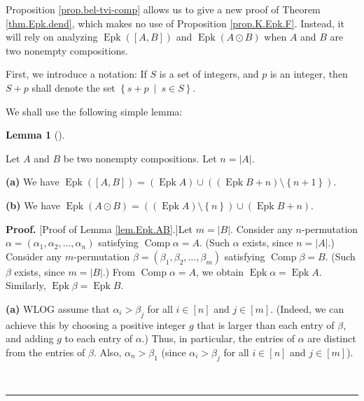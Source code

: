 \documentclass[numbers=enddot,12pt,final,onecolumn,notitlepage]{scrartcl}%
\theoremstyle{definition}
\newtheorem{lem}[theo]{Lemma}
\newenvironment{lemma}[1][]
{\begin{lem}[#1]\begin{leftbar}}
{\end{leftbar}\end{lem}}
\newenvironment{proof}[1][Proof]{\noindent\textbf{#1.} }{\ \rule{0.5em}{0.5em}}
\newenvironment{verlong}{}{}
\begin{document}
\begin{verlong}
Proposition \ref{prop.bel-tvi-comp} allows us to give a new proof of Theorem
\ref{thm.Epk.dend}, which makes no use of Proposition \ref{prop.K.Epk.F}.
Instead, it will rely on analyzing $\operatorname*{Epk}\left(  \left[
A,B\right]  \right)  $ and $\operatorname*{Epk}\left(  A\odot B\right)  $ when
$A$ and $B$ are two nonempty compositions.

First, we introduce a notation: If $S$ is a set of integers, and $p$ is an
integer, then $S+p$ shall denote the set $\left\{  s+p\ \mid\ s\in S\right\}
$.

We shall use the following simple lemma:

\begin{lemma}
\label{lem.Epk.AB}Let $A$ and $B$ be two nonempty compositions. Let
$n=\left\vert A\right\vert $.

\textbf{(a)} We have $\operatorname*{Epk}\left(  \left[  A,B\right]  \right)
=\left(  \operatorname*{Epk}A\right)  \cup\left(  \left(  \operatorname*{Epk}%
B+n\right)  \setminus\left\{  n+1\right\}  \right)  $.

\textbf{(b)} We have $\operatorname*{Epk}\left(  A\odot B\right)  =\left(
\left(  \operatorname*{Epk}A\right)  \setminus\left\{  n\right\}  \right)
\cup\left(  \operatorname*{Epk}B+n\right)  $.
\end{lemma}

\begin{proof}
[Proof of Lemma \ref{lem.Epk.AB}.]Let $m=\left\vert B\right\vert $. Consider
any $n$-permutation $\alpha=\left(  \alpha_{1},\alpha_{2},\ldots,\alpha
_{n}\right)  $ satisfying $\operatorname*{Comp}\alpha=A$. (Such $\alpha$
exists, since $n=\left\vert A\right\vert $.) Consider any $m$-permutation
$\beta=\left(  \beta_{1},\beta_{2},\ldots,\beta_{m}\right)  $ satisfying
$\operatorname*{Comp}\beta=B$. (Such $\beta$ exists, since $m=\left\vert
B\right\vert $.) From $\operatorname*{Comp}\alpha=A$, we obtain
$\operatorname*{Epk}\alpha=\operatorname*{Epk}A$. Similarly,
$\operatorname*{Epk}\beta=\operatorname*{Epk}B$.

\textbf{(a)} WLOG assume that $\alpha_{i}>\beta_{j}$ for all $i\in\left[
n\right]  $ and $j\in\left[  m\right]  $. (Indeed, we can achieve this by
choosing a positive integer $g$ that is larger than each entry of $\beta$, and
adding $g$ to each entry of $\alpha$.) Thus, in particular, the entries of
$\alpha$ are distinct from the entries of $\beta$. Also, $\alpha_{n}>\beta
_{1}$ (since $\alpha_{i}>\beta_{j}$ for all $i\in\left[  n\right]  $ and
$j\in\left[  m\right]  $).


\end{proof}
\end{verlong}
\end{document}
